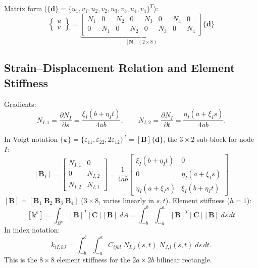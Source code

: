 \documentclass[11pt, a4paper]{article}
\begin{document}
Matrix form ($\{\mathbf{d}\}=\{u_1,v_1,u_2,v_2,u_3,v_3,u_4,v_4\}^T$):
\begin{equation}\label{eq:Nmat}
\begin{Bmatrix}u\\v\end{Bmatrix}=
\underbrace{\begin{bmatrix}
N_1 & 0 & N_2 & 0 & N_3 & 0 & N_4 & 0\\
0 & N_1 & 0 & N_2 & 0 & N_3 & 0 & N_4
\end{bmatrix}}_{[\mathbf{N}]\;(2\times 8)}\{\mathbf{d}\}
\end{equation}

\subsection{Strain--Displacement Relation and Element Stiffness}

Gradients:
\begin{equation}\label{eq:NI_grad}
N_{I,1}=\frac{\partial N_I}{\partial s}=\frac{\xi_I(b+\eta_I t)}{4ab},\qquad
N_{I,2}=\frac{\partial N_I}{\partial t}=\frac{\eta_I(a+\xi_I s)}{4ab}.
\end{equation}

In Voigt notation $\{\boldsymbol{\varepsilon}\}=\{\varepsilon_{11},\varepsilon_{22},2\varepsilon_{12}\}^T=[\mathbf{B}]\{\mathbf{d}\}$, the $3\times 2$ sub-block for node $I$:
\begin{equation}\label{eq:BI}
[\mathbf{B}_I]=
\begin{bmatrix}
N_{I,1} & 0\\
0 & N_{I,2}\\
N_{I,2} & N_{I,1}
\end{bmatrix}
=\frac{1}{4ab}
\begin{bmatrix}
\xi_I(b+\eta_I t) & 0\\
0 & \eta_I(a+\xi_I s)\\
\eta_I(a+\xi_I s) & \xi_I(b+\eta_I t)
\end{bmatrix}
\end{equation}
$[\mathbf{B}]=[\mathbf{B}_1\;\mathbf{B}_2\;\mathbf{B}_3\;\mathbf{B}_4]$ ($3\times 8$, varies linearly in $s,t$).  Element stiffness ($h=1$):
\begin{equation}\label{eq:ke}
[\mathbf{k}^e]=\int_{\Omega^e}[\mathbf{B}]^T[\mathbf{C}][\mathbf{B}]\;dA
=\int_{-b}^{b}\!\int_{-a}^{a}[\mathbf{B}]^T[\mathbf{C}][\mathbf{B}]\;ds\,dt
\end{equation}
In index notation:
\begin{equation}\label{eq:ke_index}
k_{iI,kJ}=\int_{-b}^{b}\!\int_{-a}^{a}C_{ijkl}\;N_{I,j}(s,t)\;N_{J,l}(s,t)\;ds\,dt.
\end{equation}
This is the $8\times 8$ element stiffness for the $2a\times 2b$ bilinear rectangle.
\end{document}
